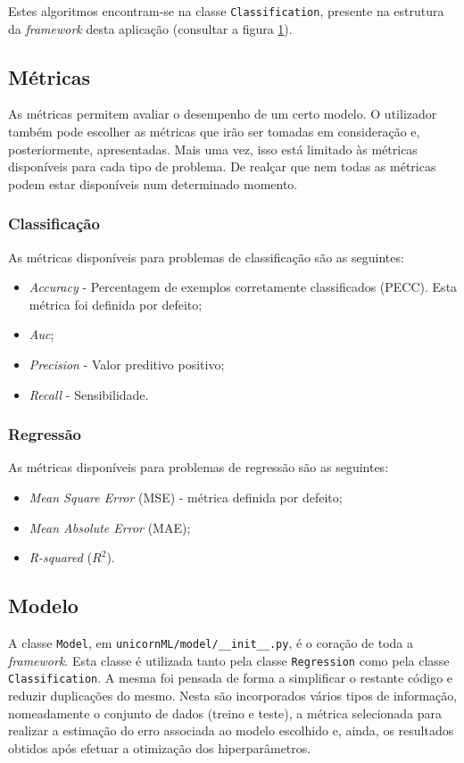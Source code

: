 \documentclass[a4paper]{report}
\begin{document}
{			Estes algoritmos encontram-se na classe \texttt{Classification}, presente na estrutura da \textit{framework} desta aplicação (consultar a figura \hyperref[fig:1]{1}).

		\subsection{Métricas} \label{subsec:Metrics}
		As métricas permitem avaliar o desempenho de um certo modelo. 
		O utilizador também pode escolher as métricas que irão ser tomadas em consideração e, posteriormente, apresentadas.
		Mais uma vez, isso está limitado às métricas disponíveis para cada tipo de problema.
		De realçar que nem todas as métricas podem estar disponíveis num determinado momento.

            \subsubsection{Classificação} \label{sssec:Classification2}
			As métricas disponíveis para problemas de classificação são as seguintes:
			\begin{itemize}
				\item \textit{Accuracy} - Percentagem de exemplos corretamente classificados (PECC). Esta métrica foi definida por defeito;
				\item \textit{Auc};
				\item \textit{Precision} - Valor preditivo positivo;
				\item \textit{Recall} - Sensibilidade.
			\end{itemize}

            \subsubsection{Regressão} \label{sssec:Regression2}
			As métricas disponíveis para problemas de regressão são as seguintes:
			\begin{itemize}
				\item \textit{Mean Square Error} (MSE) - métrica definida por defeito;
				\item \textit{Mean Absolute Error} (MAE);
				\item \textit{R-squared} ($R^{2}$).
			\end{itemize}

		\subsection{Modelo}
		A classe \texttt{Model}, em \texttt{unicornML/model/\_\_init\_\_.py}, é o coração de toda a \textit{framework}.
		Esta classe é utilizada tanto pela classe \texttt{Regression} como pela classe \texttt{Classification}.
		A mesma foi pensada de forma a simplificar o restante código e reduzir duplicações do mesmo.
		Nesta são incorporados vários tipos de informação, nomeadamente o conjunto de dados (treino e teste), a métrica selecionada para realizar a estimação do erro associada ao modelo escolhido e, ainda, os resultados obtidos após efetuar a otimização dos hiperparâmetros.

}
\end{document}
